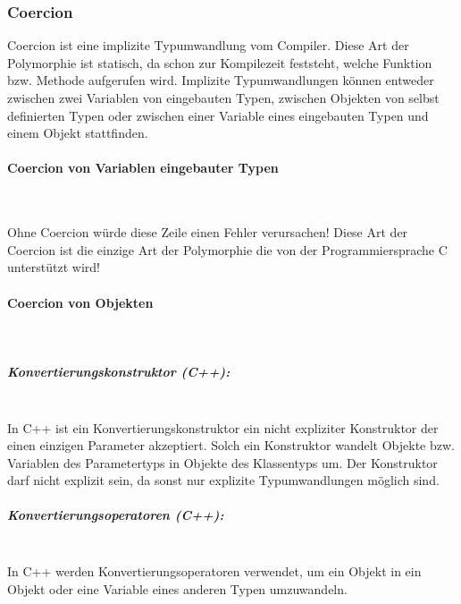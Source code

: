		\subsubsection{Coercion}
			Coercion ist eine implizite Typumwandlung vom Compiler. Diese Art der Polymorphie ist statisch, da schon zur
			Kompilezeit feststeht, welche Funktion bzw. Methode aufgerufen wird. Implizite Typumwandlungen können entweder
			zwischen zwei Variablen von eingebauten Typen, zwischen Objekten von selbst definierten Typen oder zwischen
			einer Variable eines eingebauten Typen und einem Objekt stattfinden. 
			
			\paragraph{Coercion von Variablen eingebauter Typen}\mbox{}\\
				\UseRawInputEncoding{}
				
				Ohne Coercion würde diese Zeile einen Fehler verursachen! Diese Art der Coercion ist die einzige Art der
				Polymorphie die von der Programmiersprache C unterstützt wird!
			
			\paragraph{Coercion von Objekten}\mbox{}\\
				\subparagraph*{Konvertierungskonstruktor (C++):}\mbox{}\\
					In C++ ist ein Konvertierungskonstruktor ein nicht expliziter Konstruktor der einen einzigen Parameter
					akzeptiert. Solch ein Konstruktor wandelt Objekte bzw. Variablen des Parametertyps in Objekte des
					Klassentyps um. Der Konstruktor darf nicht explizit sein, da sonst nur explizite Typumwandlungen möglich
					sind.
					
					\UseRawInputEncoding{}
				
				\subparagraph*{Konvertierungsoperatoren (C++):}\mbox{}\\
					In C++ werden Konvertierungsoperatoren verwendet, um ein Objekt in ein Objekt oder eine Variable eines
					anderen Typen umzuwandeln.
					
					\UseRawInputEncoding{}
		
